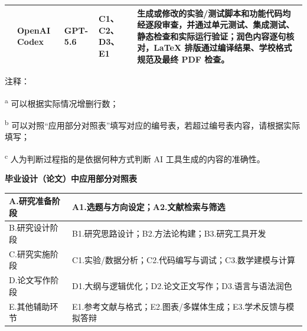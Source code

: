 \thispagestyle{empty}
{\fontsize{8.2bp}{14bp}\selectfont
\setlength{\tabcolsep}{2.4pt}
\renewcommand{\arraystretch}{1.25}
\begin{tabular}{|>{\centering\arraybackslash}m{0.75cm}|>{\centering\arraybackslash}m{1.65cm}|>{\centering\arraybackslash}m{1.20cm}|>{\centering\arraybackslash}m{1.65cm}|m{7.65cm}|}
\hline
3 & OpenAI Codex & GPT-5.6 & C1、C2、D3、E1 & 生成或修改的实验/测试脚本和功能代码均经逐段审查，并通过单元测试、集成测试、静态检查和实际运行验证；润色内容逐句核对，LaTeX 排版通过编译结果、学校格式规范及最终 PDF 检查。 \\
\hline
\end{tabular}
\par
}
\vspace{0.32cm}
{\fontsize{9.5bp}{16bp}\selectfont
\noindent 注释：\par
\noindent\textsuperscript{a} 可以根据实际情况增删行数；\par
\noindent\textsuperscript{b} 可以对照“应用部分对照表”填写对应的编号表，若超过编号表内容，请根据实际填写；\par
\noindent\textsuperscript{c} 人为判断过程指的是依据何种方式判断 AI 工具生成的内容的准确性。\par
}
\vspace{0.65cm}
{\centering\fontsize{14bp}{20bp}\selectfont\bfseries 毕业设计（论文）中应用部分对照表\par}
\vspace{0.28cm}
{\fontsize{8.9bp}{14bp}\selectfont
\setlength{\tabcolsep}{4pt}
\renewcommand{\arraystretch}{1.25}
\begin{tabular}{|m{3.4cm}|m{10.0cm}|}
\hline
A.研究准备阶段 & A1.选题与方向设定；A2.文献检索与筛选 \\
\hline
B.研究设计阶段 & B1.研究思路设计；B2.方法论构建；B3.研究工具开发 \\
\hline
C.研究实施阶段 & C1.实验/数据分析；C2.代码编写与调试；C3.数学建模与计算 \\
\hline
D.论文写作阶段 & D1.大纲与逻辑优化；D2.论文正文写作；D3.语言与语法润色 \\
\hline
E.其他辅助环节 & E1.参考文献与格式；E2.图表/多媒体生成；E3.学术反馈与模拟答辩 \\
\hline
\end{tabular}
}

